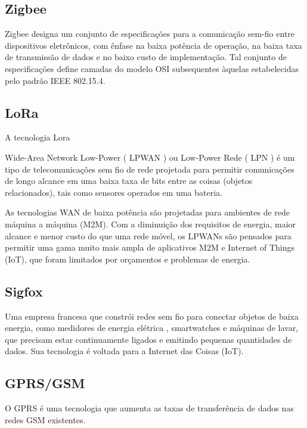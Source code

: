 \subsection{Zigbee}

Zigbee designa um conjunto de especificações para a comunicação sem-fio entre dispositivos eletrônicos, com ênfase na baixa potência de operação, na baixa taxa de transmissão de dados e no baixo custo de implementação. Tal conjunto de especificações define camadas do modelo OSI subsequentes àquelas estabelecidas pelo padrão IEEE 802.15.4.


\subsection{LoRa}

A tecnologia Lora

Wide-Area Network Low-Power ( LPWAN ) ou Low-Power Rede ( LPN ) é um tipo de telecomunicações sem fio de rede projetada para permitir comunicações de longo alcance em uma baixa taxa de bits entre as coisas (objetos relacionados), tais como sensores operados em uma bateria.

As tecnologias WAN de baixa potência são projetadas para ambientes de rede máquina a máquina (M2M). Com a diminuição dos requisitos de energia, maior alcance e menor custo do que uma rede móvel, os LPWANs são pensados para permitir uma gama muito mais ampla de aplicativos M2M e Internet of Things (IoT), que foram limitados por orçamentos e problemas de energia.



\subsection{Sigfox}

Uma empresa francesa que constrói redes sem fio para conectar objetos de baixa energia, como medidores de energia elétrica , smartwatches e máquinas de lavar, que precisam estar continuamente ligados e emitindo pequenas quantidades de dados. Sua tecnologia é voltada para a Internet das Coisas (IoT).



\subsection{GPRS/GSM}


O \ac{GPRS} é uma tecnologia que aumenta as taxas de transferência de dados nas redes \ac{GSM} existentes. 


